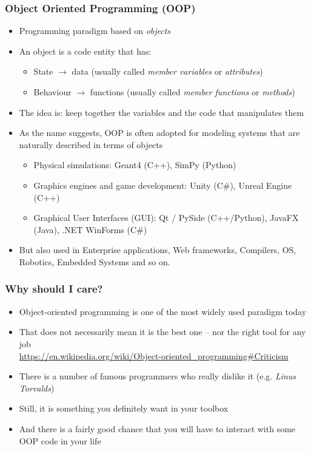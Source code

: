 \documentclass[9pt]{beamer}
\begin{document}
\begin{frame}
  \frametitle{Object Oriented Programming (OOP)}

  \begin{itemize}
    \small
    \item Programming paradigm based on \emph{objects}
    \medskip
    \item An object is a code entity that has:
    \smallskip
    \begin{itemize}
      \item \alert{State} $\rightarrow$ data (usually called \emph{member variables} or \emph{attributes})
      \smallskip
      \item \alert{Behaviour} $\rightarrow$ functions (usually called \emph{member functions} or \emph{methods})
    \end{itemize}
    \medskip
    \item The idea is: keep together the variables and the code that manipulates them
    \medskip
    \item As the name suggests, OOP is often adopted for modeling systems that are naturally
          described in terms of objects
    \begin{itemize}
      \smallskip
      \item Physical simulations: Geant4 (C++), SimPy (Python)
      \smallskip
      \item Graphics engines and game development: Unity (C\#), Unreal Engine (C++)
      \smallskip
      \item Graphical User Interfaces (GUI): Qt / PySide (C++/Python), JavaFX (Java), .NET WinForms (C\#)
    \end{itemize}
    \medskip
    \item But also used in Enterprise applications, Web frameworks, Compilers, OS, Robotics, Embedded Systems and so on.
  \end{itemize}
\end{frame}


\begin{frame}
  \frametitle{Why should I care?}

  \begin{itemize}
    \item Object-oriented programming is one of the most widely used paradigm today
    \smallskip
    \item That does not necessarily mean it is the best one -- nor the right tool for any job \\
    \tiny
    \url{https://en.wikipedia.org/wiki/Object-oriented_programming\#Criticism}
    \normalsize
    \smallskip

    \item There is a number of famous programmers who really dislike it (e.g. \emph{Linus Torvalds})
    \medskip
    \item Still, it is something you definitely want in your toolbox
    \medskip
    \item And there is a fairly good chance that you will have to interact with some OOP
          code in your life
    \smallskip
  \end{itemize}

\end{frame}
\end{document}
